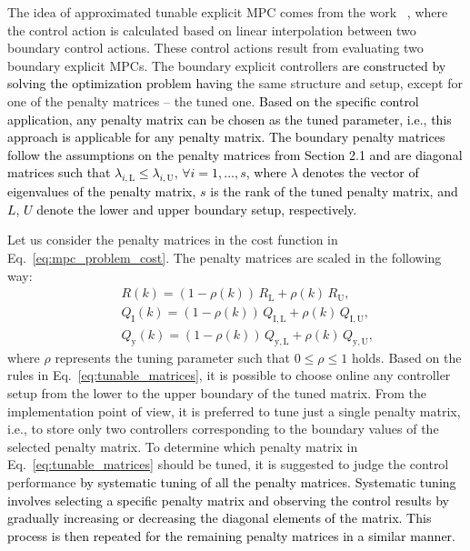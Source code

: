 \documentclass[preprint,12pt]{elsarticle}
\newcommand{\change}[1]{\textcolor{black}{#1}}
\begin{document}
	The idea of approximated tunable explicit MPC comes from the work ~\cite{Klauco_tunable}, where the control action is calculated based on linear interpolation between two boundary control actions. These control actions result from evaluating two boundary explicit MPCs. The boundary explicit controllers \change{are constructed by solving the optimization problem having} the same structure and setup, except for one of the penalty matrices -- the tuned one. \change{Based on the specific control application, any penalty matrix can be chosen as the tuned parameter, i.e., this approach is applicable for any penalty matrix. The boundary penalty matrices follow the assumptions on the penalty matrices from Section 2.1 and are diagonal matrices such that $\lambda_{i,\mathrm{L}} \le \lambda_{i,\mathrm{U}}$, $\forall i = 1,\dots,s$, where $\lambda$ denotes the vector of eigenvalues of the penalty matrix, $s$ is the rank of the tuned penalty matrix, and $L$, $U$ denote the lower and upper boundary setup, respectively. }
	
	Let us consider the penalty matrices in the cost function in Eq.~\eqref{eq:mpc_problem_cost}. The penalty matrices are scaled in the following way:
	\begin{subequations}
		\label{eq:tunable_matrices}
		\begin{eqnarray}
			\label{eq:tunable_R}
			&~& R(k) = (1-\rho(k)) \, R_\mathrm{L} + \rho(k) \, R_\mathrm{U}, \\
			\label{eq:tunable_Qx}
			&~& Q_\mathrm{I}(k) = (1-\rho(k)) \, Q_\mathrm{I,L} + \rho(k) \, Q_\mathrm{I,U}, \\
			\label{eq:tunable_Qy}
			&~& Q_\mathrm{y}(k) = (1-\rho(k)) \, Q_\mathrm{y,L} + \rho(k) \, Q_\mathrm{y,U},
		\end{eqnarray}
	\end{subequations}
	where $\rho$ represents the tuning parameter such that $0 \le \rho \le 1$ holds. Based on the rules in Eq.~\eqref{eq:tunable_matrices}, it is possible to choose online any controller setup from the lower to the upper boundary of the tuned matrix. From the implementation point of view, it is preferred to tune just a single penalty matrix, i.e., to store only two controllers corresponding to the boundary values of the selected penalty matrix. To determine which penalty matrix in Eq.~\eqref{eq:tunable_matrices} should be tuned, it is suggested to judge the control performance \change{by systematic tuning of all the penalty matrices. Systematic tuning involves selecting a specific penalty matrix and observing the control results by gradually increasing or decreasing the diagonal elements of the matrix. This process is then repeated for the remaining penalty matrices in a similar manner.}
	
\end{document}
